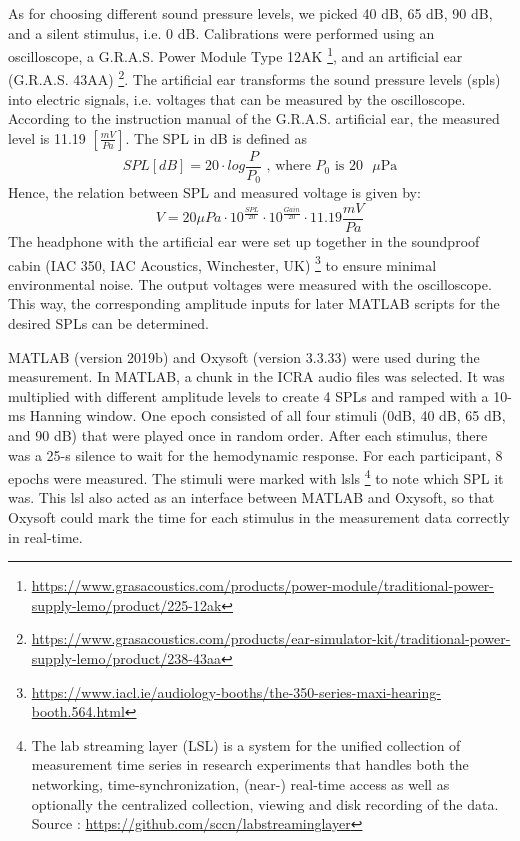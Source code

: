 As for choosing different sound pressure levels, we picked 40 dB, 65 dB, 90 dB, and a silent stimulus, i.e. 0 dB. Calibrations were performed using an oscilloscope, a G.R.A.S. Power Module Type 12AK \footnote {\url{https://www.grasacoustics.com/products/power-module/traditional-power-supply-lemo/product/225-12ak}},  and an artificial ear (G.R.A.S. 43AA) \footnote {\url {https://www.grasacoustics.com/products/ear-simulator-kit/traditional-power-supply-lemo/product/238-43aa}}. The artificial ear transforms the sound pressure levels (\acrshort{spl}s) into electric signals, i.e. voltages that can be measured by the oscilloscope. According to the instruction manual of the G.R.A.S. artificial ear, the measured level is 11.19 $[ \frac {mV}{Pa}]$. The SPL in dB is defined as 
\begin{equation}
SPL [dB] = 20 \cdot log \frac{P}{P_0} \text{ , where $P_0$ is $20$  $\mu$Pa}
\end{equation}
Hence, the relation between SPL and measured voltage is given by:
\begin{equation}
V = 20{ \mu Pa} \cdot 10^{\frac {SPL}{20}}  \cdot 10^{\frac{Gain}{20}} \cdot 11.19 {\frac {mV}{Pa}} 
\end{equation}
The headphone with the artificial ear were set up together in the soundproof cabin (IAC 350, IAC Acoustics, Winchester, UK) \footnote{\url{https://www.iacl.ie/audiology-booths/the-350-series-maxi-hearing-booth.564.html}} to ensure minimal environmental noise. The output voltages were measured with the oscilloscope. This way, the corresponding amplitude inputs for later MATLAB scripts for the desired SPLs can be determined.

MATLAB (version 2019b) and Oxysoft (version 3.3.33) were used during the measurement. In MATLAB, a chunk in the ICRA audio files was selected. It was multiplied with different amplitude levels to create 4 SPLs and ramped with a 10-ms Hanning window. One epoch consisted of  all four stimuli (0dB, 40 dB, 65 dB, and 90 dB) that were played once in random order. After each stimulus, there was a 25-s silence to wait for the hemodynamic response. For each participant, 8 epochs were measured. The stimuli were marked with \acrlong{lsl}s \footnote {The lab streaming layer (LSL) is a system for the unified collection of measurement time series in research experiments that handles both the networking, time-synchronization, (near-) real-time access as well as optionally the centralized collection, viewing and disk recording of the data. Source : \url{https://github.com/sccn/labstreaminglayer}} to note which SPL it was. This \acrlong {lsl} also acted as an interface between MATLAB and Oxysoft, so that Oxysoft could mark the time for each stimulus in the measurement data correctly in real-time.

